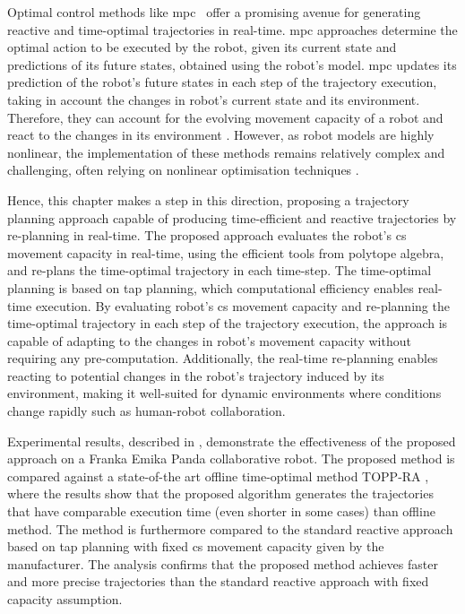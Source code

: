 Optimal control methods like \gls{mpc}~\cite{Kouvaritakis2016} offer a promising avenue for generating reactive and time-optimal trajectories in real-time. \gls{mpc} approaches determine the optimal action to be executed by the robot, given its current state and predictions of its future states, obtained using the robot's model. \gls{mpc} updates its prediction of the robot's future states in each step of the trajectory execution, taking in account the changes in robot's current state and its environment. Therefore, they can account for the evolving movement capacity of a robot and react to the changes in its environment \cite{torresalberto2022}\cite{Eckhoff2022}. However, as robot models are highly nonlinear, the implementation of these methods remains relatively complex and challenging, often relying on nonlinear optimisation techniques \cite{kelff2021, Massaro2023}. 

Hence, this chapter makes a step in this direction, proposing a trajectory planning approach capable of producing time-efficient and reactive trajectories by re-planning in real-time.  
The proposed approach evaluates the robot's \gls{cs} movement capacity in real-time, using the efficient tools from polytope algebra, and re-plans the time-optimal trajectory in each time-step. The time-optimal planning is based on \gls{tap} \cite{modernrobotics} planning, which computational efficiency enables real-time execution. 
By evaluating robot's \gls{cs} movement capacity and re-planning the time-optimal trajectory in each step of the trajectory execution, the approach is capable of adapting to the changes in robot's movement capacity without requiring any pre-computation. 
Additionally, the real-time re-planning enables reacting to potential changes in the robot's trajectory induced by its environment, making it well-suited for dynamic environments where conditions change rapidly such as human-robot collaboration. 

Experimental results, described in , demonstrate the effectiveness of the proposed approach on a Franka Emika Panda collaborative robot. The proposed method is compared against a state-of-the art offline time-optimal method TOPP-RA \cite{Pham2018}, where the results show that the proposed algorithm generates the trajectories that have comparable execution time (even shorter in some cases) than offline method.
The method is furthermore compared to the standard reactive approach based on \gls{tap} planning with fixed \gls{cs} movement capacity given by the manufacturer.  The analysis confirms that the proposed method achieves faster and more precise trajectories than the standard reactive approach with fixed capacity assumption. 

